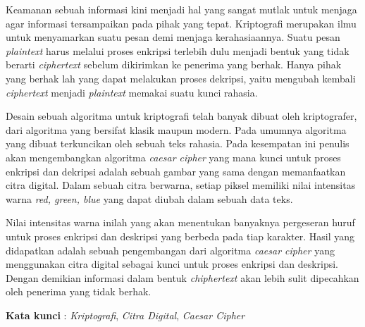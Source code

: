 \documentclass{jtetiproposalskripsi}
\begin{document}
\cover

\approvalpage


\begin{abstractind}
Keamanan sebuah informasi kini menjadi hal yang sangat mutlak untuk menjaga agar informasi tersampaikan pada pihak yang tepat. Kriptografi merupakan ilmu untuk menyamarkan suatu pesan demi menjaga kerahasiaannya. Suatu pesan \emph{plaintext} harus melalui proses enkripsi terlebih dulu menjadi bentuk yang tidak berarti \emph{ciphertext} sebelum dikirimkan ke penerima yang berhak. Hanya pihak yang berhak lah yang dapat melakukan proses dekripsi, yaitu mengubah kembali \emph{ciphertext} menjadi \emph{plaintext} memakai suatu kunci rahasia.

Desain sebuah algoritma untuk kriptografi telah banyak dibuat oleh kriptografer, dari algoritma yang bersifat klasik maupun modern. Pada umumnya algoritma yang dibuat terkuncikan oleh sebuah teks rahasia. Pada kesempatan ini penulis akan mengembangkan algoritma \emph{caesar cipher} yang mana kunci untuk proses enkripsi dan dekripsi adalah sebuah gambar yang sama dengan memanfaatkan citra digital. Dalam sebuah citra berwarna, setiap piksel memiliki nilai intensitas warna \emph{red, green, blue} yang dapat diubah dalam sebuah data teks.

Nilai intensitas warna inilah yang akan menentukan banyaknya pergeseran huruf untuk proses enkripsi dan deskripsi yang berbeda pada tiap karakter. 
Hasil yang didapatkan adalah sebuah pengembangan dari algoritma \emph{caesar cipher} yang menggunakan citra digital sebagai kunci untuk proses enkripsi dan deskripsi. Dengan demikian informasi dalam bentuk \emph{chiphertext} akan lebih sulit dipecahkan oleh penerima yang tidak berhak.



\bigskip
\textbf{Kata kunci} : \emph{Kriptografi}, \emph{Citra Digital}, \emph{Caesar Cipher}
\end{abstractind}

\tableofcontents
{}
\clearpage{}\setcounter{page}{1}
\end{document}
